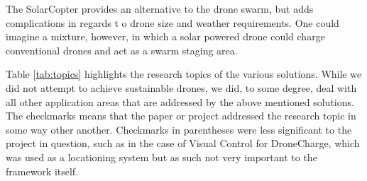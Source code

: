 The SolarCopter provides an alternative to the drone swarm, but adds complications in regards t o drone size and weather requirements. One could imagine a mixture, however, in which a solar powered drone could charge conventional drones and act as a swarm staging area.

Table \ref{tab:topics} highlights the research topics of the various solutions. While we did not attempt to achieve sustainable drones, we did, to some degree, deal with all other application areas that are addressed by the above mentioned solutions. The checkmarks means that the paper or project addressed the research topic in some way other another. Checkmarks in parentheses were less significant to the project in question, such as in the case of Visual Control for DroneCharge, which was used as a locationing system but as such not very important to the framework itself.

